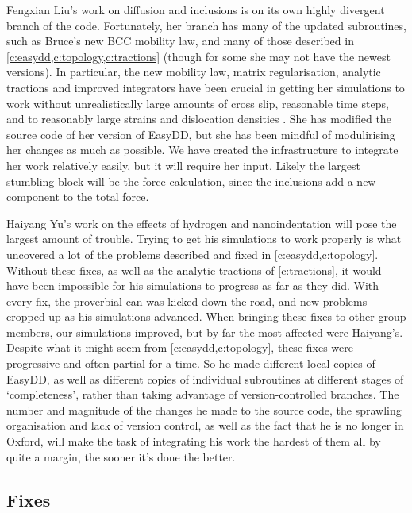Fengxian Liu's work on diffusion and inclusions is on its own highly divergent branch of the code. Fortunately, her branch has many of the updated subroutines, such as Bruce's new BCC mobility law, and many of those described in \cref{c:easydd,c:topology,c:tractions} (though for some she may not have the newest versions). In particular, the new mobility law, matrix regularisation, analytic tractions and improved integrators have been crucial in getting her simulations to work without unrealistically large amounts of cross slip, reasonable time steps, and to reasonably large strains and dislocation densities \cite{fengxian}. She has modified the source code of her version of EasyDD, but she has been mindful of modulirising her changes as much as possible. We have created the infrastructure to integrate her work relatively easily, but it will require her input. Likely the largest stumbling block will be the force calculation, since the inclusions add a new component to the total force.

Haiyang Yu's work on the effects of hydrogen and nanoindentation \cite{YU2018,yu2020simulating,yu2019influence} will pose the largest amount of trouble. Trying to get his simulations to work properly is what uncovered a lot of the problems described and fixed in \cref{c:easydd,c:topology}. Without these fixes, as well as the analytic tractions of \cref{c:tractions}, it would have been impossible for his simulations to progress as far as they did. With every fix, the proverbial can was kicked down the road, and new problems cropped up as his simulations advanced. When bringing these fixes to other group members, our simulations improved, but by far the most affected were Haiyang's. Despite what it might seem from \cref{c:easydd,c:topology}, these fixes were progressive and often partial for a time. So he made different local copies of EasyDD, as well as different copies of individual subroutines at different stages of `completeness', rather than taking advantage of version-controlled branches. The number and magnitude of the changes he made to the source code, the sprawling organisation and lack of version control, as well as the fact that he is no longer in Oxford, will make the task of integrating his work the hardest of them all by quite a margin, the sooner it's done the better.

\subsection{Fixes}

